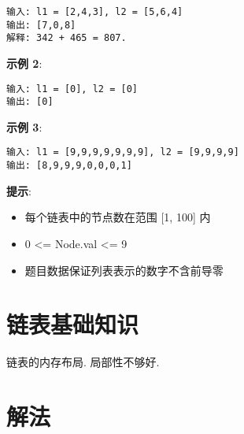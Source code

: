 \documentclass[oneside]{ctexbook}
\begin{document}
\begin{verbatim}
输入: l1 = [2,4,3], l2 = [5,6,4]
输出: [7,0,8]
解释: 342 + 465 = 807.
\end{verbatim}

\textbf{示例 2}:

\begin{verbatim}
输入: l1 = [0], l2 = [0]
输出: [0]
\end{verbatim}

\textbf{示例 3}:

\begin{verbatim}
输入: l1 = [9,9,9,9,9,9,9], l2 = [9,9,9,9]
输出: [8,9,9,9,0,0,0,1]
\end{verbatim}

\textbf{提示}:

\begin{itemize}
  \item 每个链表中的节点数在范围 [1, 100] 内
  \item 0 <= Node.val <= 9
  \item 题目数据保证列表表示的数字不含前导零
\end{itemize}

\section{链表基础知识}

链表的内存布局. 局部性不够好.

\section{解法}
\end{document}
